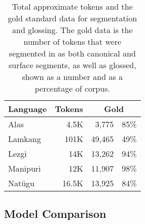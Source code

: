 \begin{table}[t]
    \centering
    \begin{tabular}{l|r|rc}
         \textbf{Language} & \textbf{Tokens} & \multicolumn{2}{c}{\textbf{Gold}} \\
         \hline
         Alas & 4.5K & 3,775 & 85\%  \\
         \hline
         Lamkang & 101K & 49,465 & 49\% \\
         \hline
         Lezgi & 14K & 13,262  &  94\% \\
         \hline
         Manipuri & 12K & 11,907 & 98\% \\
         \hline
         Natügu & 16.5K & 13,925 &  84\%  \\
    \end{tabular}
    \caption[Both Segmentation Strategies Corpora]{Total approximate tokens and the gold standard data for segmentation and glossing. The gold data is the number of tokens that were segmented in as both canonical and surface segments, as well as glossed, shown as a number and as a percentage of corpus.}
    \label{tab:goldstandard}
\end{table}

\subsection{Model Comparison}

